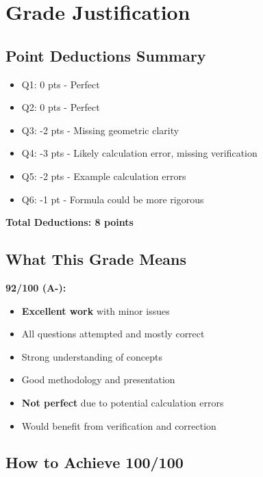 \documentclass[11pt,letterpaper]{article}
\begin{document}
\section{Grade Justification}

\subsection{Point Deductions Summary}

\begin{itemize}
    \item Q1: 0 pts - Perfect
    \item Q2: 0 pts - Perfect
    \item Q3: -2 pts - Missing geometric clarity
    \item Q4: -3 pts - Likely calculation error, missing verification
    \item Q5: -2 pts - Example calculation errors
    \item Q6: -1 pt - Formula could be more rigorous
\end{itemize}

\textbf{Total Deductions: 8 points}

\subsection{What This Grade Means}

\textbf{92/100 (A-):}
\begin{itemize}
    \item \textbf{Excellent work} with minor issues
    \item All questions attempted and mostly correct
    \item Strong understanding of concepts
    \item Good methodology and presentation
    \item \textbf{Not perfect} due to potential calculation errors
    \item Would benefit from verification and correction
\end{itemize}

\subsection{How to Achieve 100/100}
\end{document}
